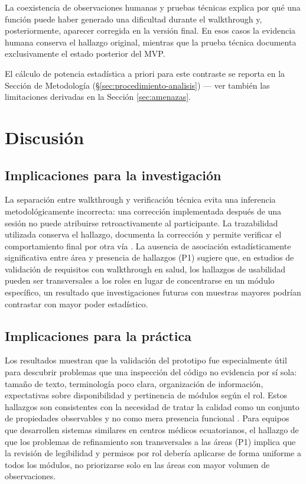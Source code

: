 \documentclass[runningheads]{llncs}
\begin{document}
	La coexistencia de observaciones humanas y pruebas técnicas explica por qué una función puede haber generado una dificultad durante el walkthrough y, posteriormente, aparecer corregida en la versión final. En esos casos la evidencia humana conserva el hallazgo original, mientras que la prueba técnica documenta exclusivamente el estado posterior del MVP.
	
	El cálculo de potencia estadística a priori para este contraste se reporta en la Sección de Metodología (\S\ref{sec:procedimiento-analisis}) --- ver también las limitaciones derivadas en la Sección \ref{sec:amenazas}.
	
	\section{Discusión}
	\subsection{Implicaciones para la investigación}
	La separación entre walkthrough y verificación técnica evita una inferencia metodológicamente incorrecta: una corrección implementada después de una sesión no puede atribuirse retroactivamente al participante. La trazabilidad utilizada conserva el hallazgo, documenta la corrección y permite verificar el comportamiento final por otra vía \cite{gotel1994,ramesh2001}. La ausencia de asociación estadísticamente significativa entre área y presencia de hallazgos (P1) sugiere que, en estudios de validación de requisitos con walkthrough en salud, los hallazgos de usabilidad pueden ser transversales a los roles en lugar de concentrarse en un módulo específico, un resultado que investigaciones futuras con muestras mayores podrían contrastar con mayor poder estadístico.
	
	\subsection{Implicaciones para la práctica}
	Los resultados muestran que la validación del prototipo fue especialmente útil para descubrir problemas que una inspección del código no evidencia por sí sola: tamaño de texto, terminología poco clara, organización de información, expectativas sobre disponibilidad y pertinencia de módulos según el rol. Estos hallazgos son consistentes con la necesidad de tratar la calidad como un conjunto de propiedades observables y no como mera presencia funcional \cite{iso25010}. Para equipos que desarrollen sistemas similares en centros médicos ecuatorianos, el hallazgo de que los problemas de refinamiento son transversales a las áreas (P1) implica que la revisión de legibilidad y permisos por rol debería aplicarse de forma uniforme a todos los módulos, no priorizarse solo en las áreas con mayor volumen de observaciones.
	
\end{document}
